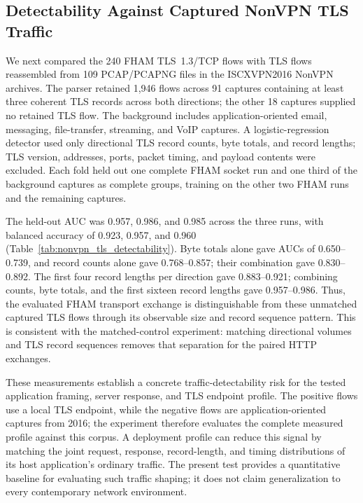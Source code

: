 \documentclass[preprint,12pt]{elsarticle}
\theoremstyle{plain}
\begin{document}
\subsection{Detectability Against Captured NonVPN TLS Traffic}

We next compared the 240 FHAM TLS~1.3/TCP flows with TLS flows reassembled from
109 PCAP/PCAPNG files in the ISCXVPN2016 NonVPN archives. The parser retained
1,946 flows across 91 captures containing at least three coherent TLS records
across both directions; the other 18 captures supplied no retained TLS flow.
The background includes application-oriented email, messaging, file-transfer,
streaming, and VoIP captures. A logistic-regression detector used only
directional TLS record counts, byte totals, and record lengths; TLS version,
addresses, ports, packet timing, and payload contents were excluded. Each fold
held out one complete FHAM socket run and one third of the background captures as
complete groups, training on the other two FHAM runs and the remaining
captures.

The held-out AUC was 0.957, 0.986, and 0.985 across the three runs, with
balanced accuracy of 0.923, 0.957, and 0.960 (Table~\ref{tab:nonvpn_tls_detectability}).
Byte totals alone gave AUCs of 0.650--0.739, and record counts alone gave
0.768--0.857; their combination gave 0.830--0.892. The first four record
lengths per direction gave 0.883--0.921; combining counts, byte totals, and
the first sixteen record lengths gave 0.957--0.986. Thus, the evaluated FHAM transport exchange is distinguishable
from these unmatched captured TLS flows through its observable size and record
sequence pattern. This is consistent with the matched-control experiment:
matching directional volumes and TLS record sequences removes that separation
for the paired HTTP exchanges.

These measurements establish a concrete traffic-detectability risk for the
tested application framing, server response, and TLS endpoint profile. The
positive flows use a local TLS endpoint, while the negative flows are
application-oriented captures from 2016; the experiment therefore evaluates
the complete measured profile against this corpus. A deployment profile can
reduce this signal by matching the joint request, response, record-length, and
timing distributions of its host application's ordinary traffic. The present
test provides a quantitative baseline for evaluating such traffic shaping;
it does not claim generalization to every contemporary network environment.
\end{document}
